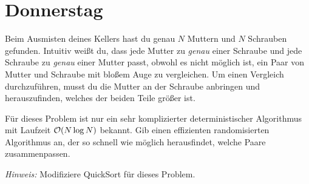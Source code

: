 \documentclass{uebung_cs}
\begin{document}
\newpage
\section*{Donnerstag}

\begin{exercise}
	Beim Ausmisten deines Kellers hast du genau $N$ Muttern und $N$ Schrauben gefunden.
	Intuitiv weißt du, dass jede Mutter zu \emph{genau} einer Schraube und jede Schraube zu \emph{genau} einer Mutter passt, obwohl es nicht möglich ist, ein Paar von Mutter und Schraube mit bloßem Auge zu vergleichen. 
	Um einen Vergleich durchzuführen, musst du die Mutter an der Schraube anbringen und herauszufinden, welches der beiden Teile größer ist. 

	Für dieses Problem ist nur ein sehr komplizierter deterministischer Algorithmus mit Laufzeit $\mathcal{O}(N \log N)$ bekannt. 
	Gib einen effizienten randomisierten Algorithmus an, der so schnell wie möglich herausfindet, welche Paare zusammenpassen. 
	
	\textit{Hinweis:} Modifiziere QuickSort für dieses Problem.
\end{exercise}
\end{document}
